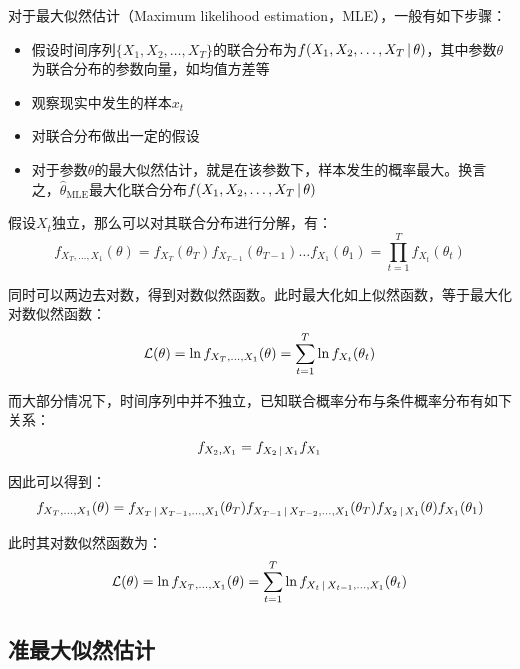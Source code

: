 \documentclass[11pt]{article}
\begin{document}
对于最大似然估计（Maximum likelihood estimation，MLE），一般有如下步骤：
\begin{itemize}
    \item 假设时间序列$\{X_1,X_2,\dots,X_T\}$的联合分布为$f(X_1,X_2,\dots,X_T \,\vert\, \theta)$，其中参数$\theta$为联合分布的参数向量，如均值方差等
    \item 观察现实中发生的样本$x_t$
    \item 对联合分布做出一定的假设
    \item 对于参数$\theta$的最大似然估计，就是在该参数下，样本发生的概率最大。换言之，$\hat{\theta}_{\text{MLE}}$最大化联合分布$f(X_1,X_2,\dots,X_T \,\vert\, \theta)$
\end{itemize}

假设$X_t$独立，那么可以对其联合分布进行分解，有：
\begin{equation*}
    f_{X_T,\dots,X_1}(\theta)
    = f_{X_T}(\theta_T) f_{X_{T-1}}(\theta_{T-1})\dots f_{X_1}(\theta_1)
    = \prod_{t=1}^{T} f_{X_t}(\theta_t)
\end{equation*}

同时可以两边去对数，得到对数似然函数。此时最大化如上似然函数，等于最大化对数似然函数：
\begin{equation*}
    \mathcal{L}(\theta) = \ln f_{X_T,\dots,X_1}(\theta)
    = \sum_{t=1}^{T} \ln f_{X_t}(\theta_t)
\end{equation*}

而大部分情况下，时间序列中并不独立，已知联合概率分布与条件概率分布有如下关系：
\begin{equation*}
    f_{X_2,X_1} = f_{X_2 \,\vert\, X_1} f_{X_1}
\end{equation*}

因此可以得到：
\begin{equation*}
    f_{X_T,\dots,X_1}(\theta) =
    f_{X_{T} \,\vert\, X_{T-1},\dots,X_1}(\theta_T)
    f_{X_{T-1} \,\vert\, X_{T-2},\dots,X_1}(\theta_T)
    f_{X_{2} \,\vert\, X_1}(\theta) f_{X_1}(\theta_1)
\end{equation*}

此时其对数似然函数为：
\begin{equation*}
    \mathcal{L}(\theta) = \ln f_{X_T,\dots,X_1}(\theta)
    = \sum_{t=1}^{T} \ln f_{X_t \,\vert\, X_{t-1},\dots,X_1}(\theta_t)
\end{equation*}

\subsection{准最大似然估计}
\end{document}
